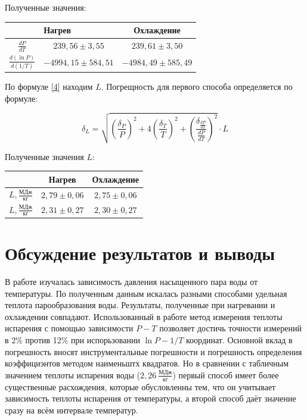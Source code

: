 \documentclass[a4paper, 12pt]{article}
\begin{document}
Полученные значения:

\begin{table}[h!]
\begin{tabular}{|c|cl|c|}
\hline
                          & \multicolumn{2}{l|}{Нагрев}        & Охлаждение    \\ \hline
$\frac{dP}{dT}$ & \multicolumn{2}{c|}{$239,56\pm3,55$} & $239,61\pm3,50$ \\ \hline
$\frac{d(\ln{P})}{d(1/T)}$ & \multicolumn{2}{c|}{$-4994,15\pm584,51$} & $-4984,49\pm585,49$ \\ \hline
\end{tabular}
\end{table}
\vspace{3 cm}
По формуле \eqref{4} находим $L$. Погрещность для первого способа определяется по формуле:

\begin{equation}\label{5}
\delta{_L} = \sqrt{\left(\frac{\delta{_P}}{P}\right)^2 + 4\left(\frac{\delta{_T}}{T}\right)^2 + \left(\frac{\delta{_{\frac{dP}{dT}}}}{\frac{dP}{dT}}\right)^2} \cdot L
\end{equation}

Полученные значения $L$:

\begin{table}[h!]
\renewcommand{\arraystretch}{1.8}
\begin{tabular}{|c|cl|c|}
\hline
                                    & \multicolumn{2}{c|}{Нагрев}       & Охлаждение   \\ \hline
$L, \frac{\text{МДж}}{\text{кг}}$ & \multicolumn{2}{c|}{$2,79\pm0,06$} & $2,75\pm0,06$ \\ \hline
$L, \frac{\text{МДж}}{\text{кг}}$ & \multicolumn{2}{c|}{$2,31\pm0,27$} & $2,30\pm0,27$ \\ \hline
\end{tabular}
\end{table}

\section{Обсуждение результатов и выводы}

В работе изучалась зависимость давления насыщенного пара воды от температуры. По полученным данным искалась разными способами удельная теплота парообразования воды. Результаты, полученные при нагревании и охлаждении совпадают. Использованный в работе метод измерения теплоты испарения с помощью зависимости $P-T$ позволяет достичь точности измерений в 2\% против 12\% при испорьзовании $\ln{P}-1/T$ координат. Основной вклад в погрешность вносят инструментальные погрешности и погрешность определения коэффициэнтов методом наименьштх квадратов. Но в сравнении с табличным значением теплоты испарения воды ($2,26~\frac{\text{МДж}}{\text{кг}}$) первый способ имеет более существенные расхождения, которые обусловленны тем, что он учитывает зависимость теплоты испарения от температуры, а второй способ даёт значение сразу на всём интервале температур.
\end{document}
